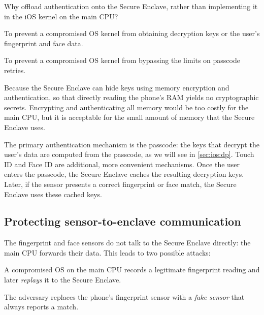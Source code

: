 Why offload authentication onto the Secure Enclave, rather than
implementing it in the iOS kernel on the main CPU?
\begin{compactitem}
  \item To prevent a compromised OS kernel from obtaining decryption keys
        or the user's fingerprint and face data.
  \item To prevent a compromised OS kernel from bypassing the limits on
        passcode retries.
  \item Because the Secure Enclave can hide keys using memory encryption
        and authentication, so that directly reading the phone's RAM
        yields no cryptographic secrets.
        Encrypting and authenticating all memory would be too costly for
        the main CPU, but it is acceptable for the small amount of memory
        that the Secure Enclave uses.
\end{compactitem}

The primary authentication mechanism is the passcode: the keys that
decrypt the user's data are computed from the passcode, as we will see
in \cref{sec:ios:dp}.
Touch ID and Face ID are additional, more convenient mechanisms.
Once the user enters the passcode, the Secure Enclave caches the
resulting decryption keys.
Later, if the sensor presents a correct fingerprint or face match, the
Secure Enclave uses these cached keys.

\subsection{Protecting sensor-to-enclave communication}

The fingerprint and face sensors do not talk to the Secure Enclave
directly: the main CPU forwards their data. This leads to two possible
attacks:
\begin{compactitem}
  \item A compromised OS on the main CPU records a legitimate fingerprint
        reading and later \emph{replays} it to the Secure Enclave.
  \item The adversary replaces the phone's fingerprint sensor with a
        \emph{fake sensor} that always reports a match.
\end{compactitem}

